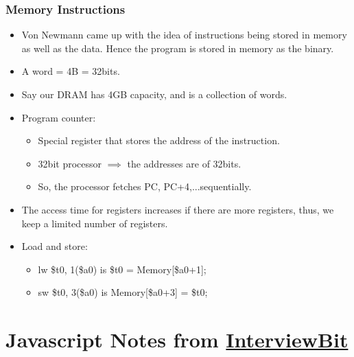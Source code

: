 \documentclass{report}
\begin{document}
\subsection{Memory Instructions}
\begin{itemize}
\item Von Newmann came up with the idea of instructions being stored in memory as well as the data. Hence the program is stored in memory as the binary.
\item A word = 4B = 32bits.
\item Say our DRAM has 4GB capacity, and is a collection of words.
\item Program counter:
\begin{itemize}
\item Special register that stores the address of the instruction.
\item 32bit processor $\implies$ the addresses are of 32bits.
\item So, the processor fetches PC, PC+4,...sequentially.
\end{itemize}
\item The access time for registers increases if there are more registers, thus, we keep a limited number of registers.
\item Load and store:
\begin{itemize}
    \item lw \$t0, 1(\$a0) is \$t0 = Memory[\$a0+1];
    \item sw \$t0, 3(\$a0) is Memory[\$a0+3] = \$t0;
\end{itemize}

\end{itemize}
\chapter{Javascript Notes from \href{https://www.interviewbit.com/javascript-interview-questions/}{InterviewBit}}
\end{document}
